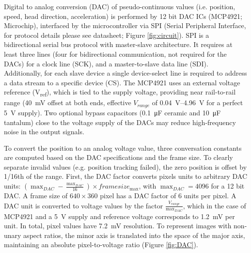 Digital to analog conversion (DAC) of pseudo-continuous values (i.e. position, speed, head direction, acceleration) is performed by 12 bit DAC ICs (MCP4921; Microchip), interfaced by the microcontroller via SPI (Serial Peripheral Interface, for protocol details please see datasheet; Figure \ref{fig:circuit}). SPI is a bidirectional serial bus protocol with master-slave architecture. It requires at least three lines (four for bidirectional communication, not required for the DACs) for a clock line (SCK), and a master-to-slave data line (SDI). Additionally, for each slave device a single device-select line is required to address a data stream to a specific device (CS). The MCP4921 uses an external voltage reference (V\textsubscript{ref}), which is tied to the supply voltage, providing near rail-to-rail range (\SI{40}{\milli\volt} offset at both ends, effective $V_{range}$ of \SIrange{0.04}{4.96}{\volt} for a perfect \SI{5}{\volt} supply). Two optional bypass capacitors (\SI{0.1}{\micro\farad} ceramic and \SI{10}{\micro\farad} tantalum) close to the voltage supply of the DACs may reduce high-frequency noise in the output signals.

To convert the position to an analog voltage value, three conversation constants are computed based on the DAC specifications and the frame size. To clearly separate invalid values (e.g. position tracking failed), the zero position is offset by 1/16th of the range. First, the DAC factor converts pixels units to arbitrary DAC units: $(\max_{DAC}-\frac{\max_{DAC}}{16})\times framesize_{\max}$, with $\max_{DAC}=4096$ for a 12 bit DAC. A frame size of $640\times360$ pixel has a DAC factor of 6 units per pixel. A DAC unit is converted to voltage values by the factor $\frac{V_{range}}{\max_{DAC}}$, which in the case of MCP4921 and a \SI{5}{\volt} supply and reference voltage corresponds to \SI{1.2}{\milli\volt} per unit. In total, pixel values have \SI{7.2}{\milli\volt} resolution. To represent images with non-unary aspect ratios, the minor axis is translated into the space of the major axis, maintaining an absolute pixel-to-voltage ratio (Figure \ref{fig:DAC}).

